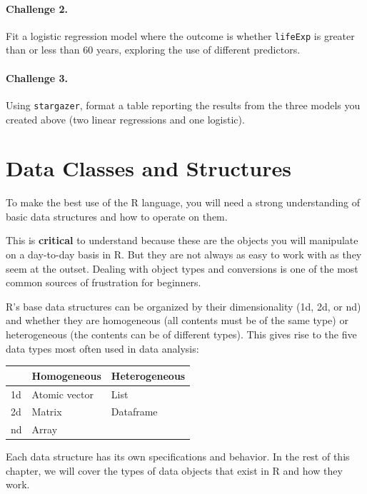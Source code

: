 \documentclass[]{book}
\begin{document}
\subsubsection*{Challenge 2.}\label{challenge-2.-7}

Fit a logistic regression model where the outcome is whether
\texttt{lifeExp} is greater than or less than 60 years, exploring the
use of different predictors.

\subsubsection*{Challenge 3.}\label{challenge-3.-5}

Using \texttt{stargazer}, format a table reporting the results from the
three models you created above (two linear regressions and one
logistic).

\chapter{Data Classes and Structures}\label{data-classes-and-structures}

To make the best use of the R language, you will need a strong
understanding of basic data structures and how to operate on them.

This is \textbf{critical} to understand because these are the objects
you will manipulate on a day-to-day basis in R. But they are not always
as easy to work with as they seem at the outset. Dealing with object
types and conversions is one of the most common sources of frustration
for beginners.

R's base data structures can be organized by their dimensionality (1d,
2d, or nd) and whether they are homogeneous (all contents must be of the
same type) or heterogeneous (the contents can be of different types).
This gives rise to the five data types most often used in data analysis:

\begin{longtable}[]{@{}lll@{}}
\toprule
& Homogeneous & Heterogeneous\tabularnewline
\midrule
\endhead
1d & Atomic vector & List\tabularnewline
2d & Matrix & Dataframe\tabularnewline
nd & Array &\tabularnewline
\bottomrule
\end{longtable}

Each data structure has its own specifications and behavior. In the rest
of this chapter, we will cover the types of data objects that exist in R
and how they work.
\end{document}
